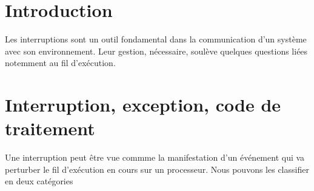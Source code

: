 %      
\section{Introduction}

   Les interruptions sont un outil fondamental dans la communication
d'un système avec son environnement. Leur gestion, nécessaire, soulève
quelques questions liées notemment au fil d'exécution.

%      
\section{Interruption, exception, code de traitement}

   Une interruption peut être vue commme la manifestation d'un
événement qui va perturber le fil d'exécution en cours sur un
processeur. Nous pouvons les classifier en deux catégories


